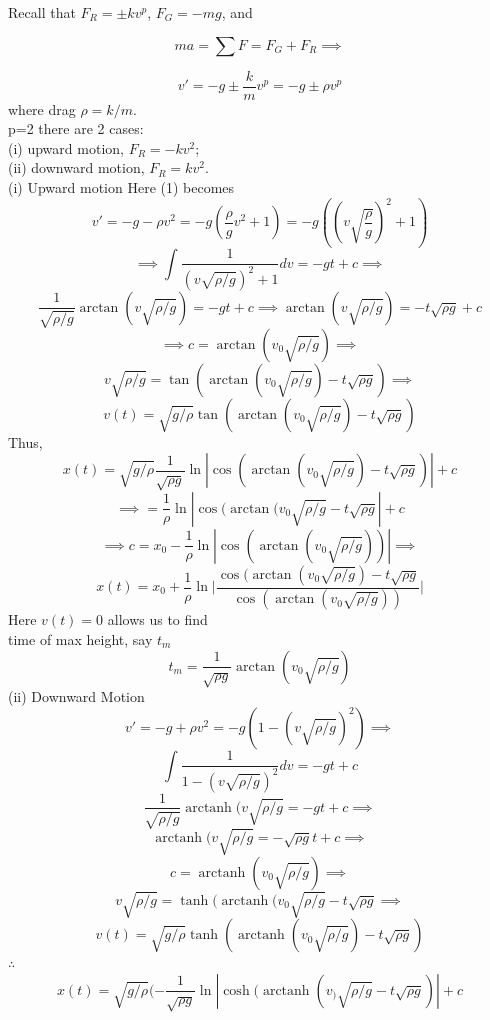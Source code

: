 \documentclass[10pt,a4paper]{article}
\DeclareMathOperator\arctanh{arctanh}
\theoremstyle{definition}
\begin{document}

  \newpage
  Recall that \(F_R = \pm kv^p  \), \( F_G = -mg \), and 

  \[ ma = \sum F = F_G + F_R \implies \]

  \[
  \tag{1}
  \label{eq:}
  v' = -g \pm \frac{k}{m} v^p = -g \pm \rho v^p
  \]
  where drag \( \rho = k/m \).\\
  p=2 there are 2 cases: \\
  (i) upward motion, \( F_R = -kv^2 \);\\
  (ii) downward motion, \( F_R = kv^2 \).\\[5mm]
  (i) Upward motion
  Here (1) becomes 
  \[ v' = -g-\rho v^2 = -g( \frac{\rho}{g} v^2 + 1) = -g((v \sqrt{
  \frac{\rho}{g}})^2+1) \]
  \[ \implies \int \frac{1}{(v \sqrt{\rho/g})^2 + 1} dv = -gt + c \implies \]
  \[ \frac{1}{ \sqrt{\rho/g}} \arctan(v \sqrt{\rho/g}) = -gt + c \implies
  \arctan  (v \sqrt{\rho/g}) = -t \sqrt{\rho g} + c \]
  \[ \implies c = \arctan (v_0 \sqrt{\rho/g}) \implies \]
  \[ v \sqrt{\rho/g} = \tan ( \arctan (v_0\sqrt{\rho/g}) - t \sqrt{\rho g})
  \implies\]
  \[ \boxed{v(t) = \sqrt{g/ \rho} \tan ( \arctan( v_0\sqrt{\rho/g}) - t
  \sqrt{\rho g})} \]
  Thus, 
  \[ x(t) = \sqrt{g/\rho} \frac{1}{ \sqrt{\rho g}} \ln | \cos(\arctan(v_0
  \sqrt{\rho/g}) -t \sqrt{\rho g})| + c \]
  \[ \implies = \frac{1}{\rho} \ln | \cos (\arctan(v_0 \sqrt{\rho/g} - t
  \sqrt{\rho g}| +c \]
  \[\implies c = x_0 - \frac{1}{\rho} \ln | \cos ( \arctan (v_0 \sqrt{\rho/g}))|
  \implies \]
  \[ \boxed{ x(t) = x_0 + \frac{1}{\rho} \ln \bigg| \frac{\cos(\arctan(v_0
  \sqrt{\rho/g}) -t \sqrt{\rho g}}{\cos (\arctan (v_0 \sqrt{\rho/g}))}
  \bigg|}  \]
  Here \( v(t) = 0 \) allows us to find \\
  time of max height, say \( t_m \)
  \[ \boxed{ t_m = \frac{1}{ \sqrt{\rho g}} \arctan(v_0 \sqrt{\rho /g})} \]
  (ii) Downward Motion
  \[ v' = -g+\rho v^2 = -g(1 - (v \sqrt{\rho/g})^2) \implies \]
  \[ \int \frac{1}{1 - (v \sqrt{\rho/g})^2}dv = -gt + c \] %
  \[ \frac{1}{ \sqrt{\rho/g}} \arctanh (v \sqrt{\rho/g} = -gt + c \implies
  \] 
  \[ \arctanh (v \sqrt{\rho/g} = - \sqrt{\rho g} t + c \implies \]
  \[ c = \arctanh ( v_0 \sqrt{\rho/g} ) \implies \]
  \[ v \sqrt{\rho/g} = \tanh ( \arctanh(v_0 \sqrt{\rho/g} - t \sqrt{\rho g}
  \implies\]
  \[ \boxed{ v(t) = \sqrt{g/\rho} \tanh ( \arctanh (v_0 \sqrt{\rho/g})-t
  \sqrt{\rho g})} \]
  \( \therefore \)
  \[ x(t)= \sqrt{g/\rho}( -\frac{1}{ \sqrt{\rho g}} \ln | \cosh ( \arctanh
  (v_) \sqrt{\rho/g} -t \sqrt{\rho g}) | + c\]
\end{document}

